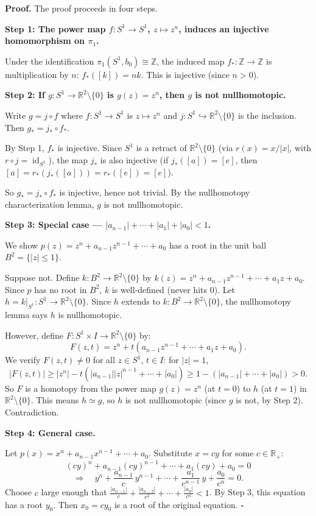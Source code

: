 \documentclass[11pt]{report}
\renewenvironment{proof}[1][Proof]{\noindent\textbf{#1.} }{\hfill$\square$\par\vspace{5pt}}
\begin{document}
\begin{proof}
The proof proceeds in four steps.

\textbf{Step 1: The power map $f: S^1 \to S^1$, $z \mapsto z^n$, induces an injective homomorphism on $\pi_1$.}

Under the identification $\pi_1(S^1, b_0) \cong \mathbb{Z}$, the induced map $f_*: \mathbb{Z} \to \mathbb{Z}$ is multiplication by $n$: $f_*([k]) = nk$. This is injective (since $n > 0$).

\textbf{Step 2: If $g: S^1 \to \mathbb{R}^2 \setminus \{0\}$ is $g(z) = z^n$, then $g$ is not nullhomotopic.}

Write $g = j \circ f$ where $f: S^1 \to S^1$ is $z \mapsto z^n$ and $j: S^1 \hookrightarrow \mathbb{R}^2 \setminus \{0\}$ is the inclusion. Then $g_* = j_* \circ f_*$.

By Step 1, $f_*$ is injective. Since $S^1$ is a retract of $\mathbb{R}^2 \setminus \{0\}$ (via $r(x) = x/|x|$, with $r \circ j = \operatorname{id}_{S^1}$), the map $j_*$ is also injective (if $j_*([a]) = [e]$, then $[a] = r_*(j_*([a])) = r_*([e]) = [e]$).

So $g_* = j_* \circ f_*$ is injective, hence not trivial. By the nullhomotopy characterization lemma, $g$ is not nullhomotopic.

\textbf{Step 3: Special case --- $|a_{n-1}| + \cdots + |a_1| + |a_0| < 1$.}

We show $p(z) = z^n + a_{n-1}z^{n-1} + \cdots + a_0$ has a root in the unit ball $B^2 = \{|z| \leq 1\}$.

Suppose not. Define $k: B^2 \to \mathbb{R}^2 \setminus \{0\}$ by $k(z) = z^n + a_{n-1}z^{n-1} + \cdots + a_1 z + a_0$. Since $p$ has no root in $B^2$, $k$ is well-defined (never hits $0$). Let $h = k|_{S^1}: S^1 \to \mathbb{R}^2 \setminus \{0\}$. Since $h$ extends to $k: B^2 \to \mathbb{R}^2 \setminus \{0\}$, the nullhomotopy lemma says $h$ is nullhomotopic.

However, define $F: S^1 \times I \to \mathbb{R}^2 \setminus \{0\}$ by:
\[F(z, t) = z^n + t(a_{n-1}z^{n-1} + \cdots + a_1 z + a_0).\]
We verify $F(z, t) \neq 0$ for all $z \in S^1$, $t \in I$: for $|z| = 1$,
\[|F(z, t)| \geq |z^n| - t(|a_{n-1}||z|^{n-1} + \cdots + |a_0|) \geq 1 - (|a_{n-1}| + \cdots + |a_0|) > 0.\]
So $F$ is a homotopy from the power map $g(z) = z^n$ (at $t = 0$) to $h$ (at $t = 1$) in $\mathbb{R}^2 \setminus \{0\}$. This means $h \simeq g$, so $h$ is not nullhomotopic (since $g$ is not, by Step 2). Contradiction.

\textbf{Step 4: General case.}

Let $p(x) = x^n + a_{n-1}x^{n-1} + \cdots + a_0$. Substitute $x = cy$ for some $c \in \mathbb{R}_+$:
\[(cy)^n + a_{n-1}(cy)^{n-1} + \cdots + a_1(cy) + a_0 = 0\]
\[\Rightarrow \quad y^n + \frac{a_{n-1}}{c}\,y^{n-1} + \cdots + \frac{a_1}{c^{n-1}}\,y + \frac{a_0}{c^n} = 0.\]
Choose $c$ large enough that $\frac{|a_{n-1}|}{c} + \frac{|a_{n-2}|}{c^2} + \cdots + \frac{|a_0|}{c^n} < 1$. By Step 3, this equation has a root $y_0$. Then $x_0 = cy_0$ is a root of the original equation.
\end{proof}
\end{document}

